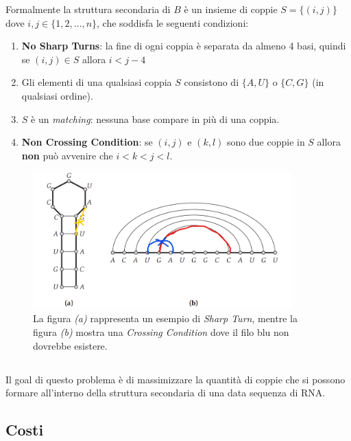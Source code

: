 Formalmente la struttura secondaria di $B$ è un insieme di coppie $S =
    \{(i,j)\}$ dove $i,j \in \{1,2,\ldots,n\}$, che soddisfa le seguenti
condizioni:

\begin{enumerate}
    \item \textbf{No Sharp Turns}: la fine di ogni coppia è separata da almeno 4
          basi, quindi se $(i,j) \in S$ allora $i < j - 4$
    \item Gli elementi di una qualsiasi coppia $S$ consistono di $\{A, U\}$ o
          $\{C, G\}$ (in qualsiasi ordine).
    \item $S$ è un \textit{matching}: nessuna base compare in più di una coppia.
    \item \textbf{Non Crossing Condition}: se $(i, j)$ e $(k,l)$ sono due coppie
          in $S$ allora \textbf{non} può avvenire che $i < k < j < l$.
\end{enumerate}

\begin{figure}[H]
    \centering
    \includegraphics[width=10cm, keepaspectratio]{capitoli/dynamic_programming/imgs/rna_esempio2.png}
    \caption{La figura \textit{(a)} rappresenta un esempio di \textit{Sharp
            Turn}, mentre la figura \textit{(b)} mostra una
        \textit{Crossing Condition} dove il filo blu non dovrebbe esistere.}
\end{figure}

\subsection{\goal}

Il goal di questo problema è di massimizzare la quantità di coppie che si possono
formare all'interno della struttura secondaria di una data sequenza di RNA.

\subsection{Costi}


